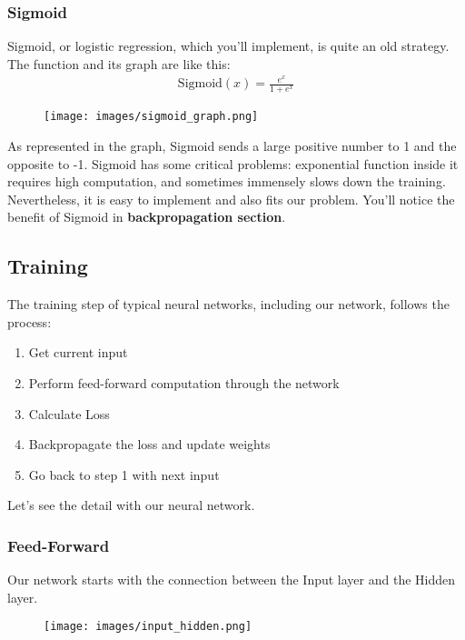 \documentclass{oblivoir}
\begin{document}
\subsubsection{Sigmoid}

Sigmoid, or logistic regression, which you'll implement, is quite an old strategy. The function and its graph are like this:
\begin{align*}
    \text{Sigmoid}(x) = \frac{e^x}{1 + e^x}
\end{align*}
\begin{figure}[h]
    \centering
    \texttt{[image: images/sigmoid\_graph.png]}
\end{figure}

As represented in the graph, Sigmoid sends a large positive number to 1 and the opposite to -1. Sigmoid has some critical problems: exponential function inside it requires high computation, and sometimes immensely slows down the training.  Nevertheless, it is easy to implement and also fits our problem. You'll notice the benefit of Sigmoid in \textbf{backpropagation section}.  

\subsection{Training}

The training step of typical neural networks, including our network, follows the process: 
\begin{enumerate}
    \item Get current input
    \item Perform feed-forward computation through the network
    \item Calculate Loss
    \item Backpropagate the loss and update weights
    \item Go back to step 1 with next input
\end{enumerate}

Let's see the detail with our neural network.

\subsubsection{Feed-Forward}

Our network starts with the connection between the Input layer and the Hidden layer.

\begin{figure}[h]
    \centering
    \texttt{[image: images/input\_hidden.png]}
\end{figure}
\end{document}
